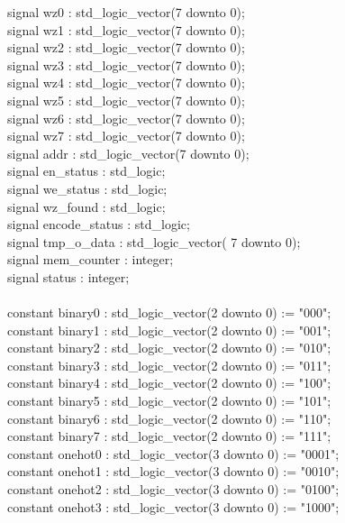 \documentclass{article}
\begin{document}
{\selectfont
signal wz0 : std\_logic\_vector(7 downto 0);\\
signal wz1 : std\_logic\_vector(7 downto 0);\\
signal wz2 : std\_logic\_vector(7 downto 0);\\
signal wz3 : std\_logic\_vector(7 downto 0);\\
signal wz4 : std\_logic\_vector(7 downto 0);\\
signal wz5 : std\_logic\_vector(7 downto 0);\\
signal wz6 : std\_logic\_vector(7 downto 0);\\
signal wz7 : std\_logic\_vector(7 downto 0);\\
signal addr : std\_logic\_vector(7 downto 0);\\
signal en\_status : std\_logic;\\
signal we\_status : std\_logic;\\
signal wz\_found : std\_logic;\\
signal encode\_status : std\_logic;\\
signal tmp\_o\_data : std\_logic\_vector( 7 downto 0);\\
signal mem\_counter : integer;\\
signal status : integer;\\\\
constant binary0 : std\_logic\_vector(2 downto 0) := "000";\\
constant binary1 : std\_logic\_vector(2 downto 0) := "001";\\
constant binary2 : std\_logic\_vector(2 downto 0) := "010";\\
constant binary3 : std\_logic\_vector(2 downto 0) := "011";\\
constant binary4 : std\_logic\_vector(2 downto 0) := "100";\\
constant binary5 : std\_logic\_vector(2 downto 0) := "101";\\
constant binary6 : std\_logic\_vector(2 downto 0) := "110";\\
constant binary7 : std\_logic\_vector(2 downto 0) := "111";\\
constant onehot0 : std\_logic\_vector(3 downto 0) := "0001";\\
constant onehot1 : std\_logic\_vector(3 downto 0) := "0010";\\
constant onehot2 : std\_logic\_vector(3 downto 0) := "0100";\\
constant onehot3 : std\_logic\_vector(3 downto 0) := "1000";\\\\\\
}
\end{document}

